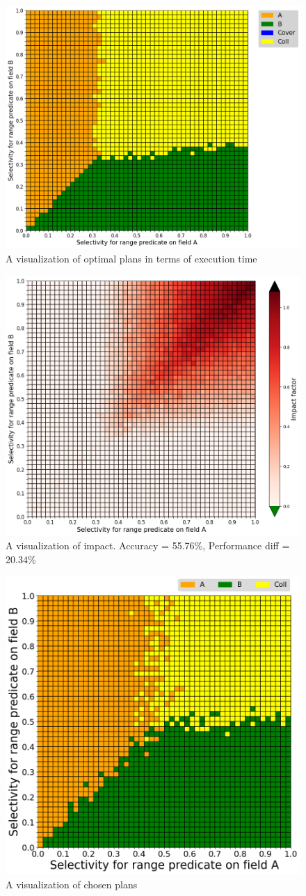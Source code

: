 \begin{figure}[htb]
    \centering
    \includegraphics[width=0.6\linewidth]{images/results-without-covering-index/mongo-with-coll/comprehensive_practical_winner.png}
    \caption{A visualization of optimal plans in terms of execution time}
    \label{fig:mongo-with-coll-v1}
\end{figure}

\begin{figure}[htb]
    \centering
    \includegraphics[width=0.5\linewidth]{images/results-without-covering-index/mongo-with-coll/comprehensive_summary_accuracy=55.76_overall_percentage_change=20.34.png}
    \caption{A visualization of impact. Accuracy = 55.76\%, Performance diff = 20.34\%}
    \label{fig:mongo-with-fix-v1}
\end{figure}


\begin{figure}[htb]
    \centering
    \includegraphics[width=0.6\linewidth]{images/results-without-covering-index/mongo-with-coll-with-fix/comprehensive_mongo_choice.png}
    \caption{A visualization of chosen plans}
    \label{fig:mongo-choice-v2}
\end{figure}

